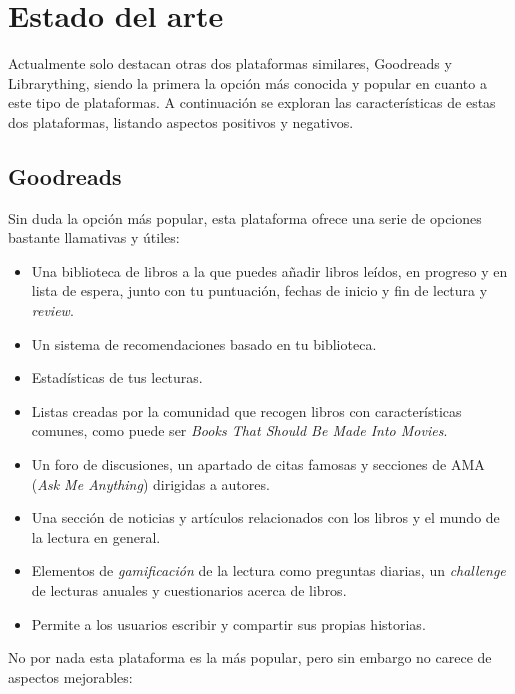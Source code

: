 \chapter{Estado del arte}

Actualmente solo destacan otras dos plataformas similares, Goodreads\cite{Goodreads} y Librarything\cite{Librarything}, siendo la primera la opción más conocida y popular en cuanto a este tipo de plataformas. A continuación se exploran las características de estas dos plataformas, listando aspectos positivos y negativos.

\section{Goodreads}

Sin duda la opción más popular, esta plataforma ofrece una serie de opciones bastante llamativas y útiles:

\begin{itemize}
    \item Una biblioteca de libros a la que puedes añadir libros leídos, en progreso y en lista de espera, junto con tu puntuación, fechas de inicio y fin de lectura y \textit{review}.
    \item Un sistema de recomendaciones basado en tu biblioteca.
    \item Estadísticas de tus lecturas.
    \item Listas creadas por la comunidad que recogen libros con características comunes, como puede ser \textit{Books That Should Be Made Into Movies}.
    \item Un foro de discusiones, un apartado de citas famosas y secciones de AMA (\textit{Ask Me Anything}) dirigidas a autores.
    \item Una sección de noticias y artículos relacionados con los libros y el mundo de la lectura en general.
    \item Elementos de \textit{gamificación} de la lectura como preguntas diarias, un \textit{challenge} de lecturas anuales y cuestionarios acerca de libros.
    \item Permite a los usuarios escribir y compartir sus propias historias.
\end{itemize}

No por nada esta plataforma es la más popular, pero sin embargo no carece de aspectos mejorables:

